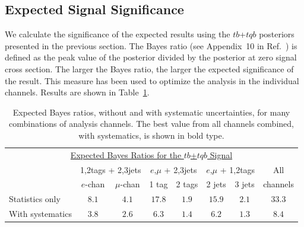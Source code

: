 \subsection{Expected Signal Significance}

We calculate the significance of the expected results using the
$tb$+$tqb$ posteriors presented in the previous section. The Bayes
ratio (see Appendix~10 in Ref.~\cite{general-note}) is defined as the
peak value of the posterior divided by the posterior at zero signal
cross section. The larger the Bayes ratio, the larger the expected
significance of the result. This measure has been used to optimize the
analysis in the individual channels.  Results are shown in
Table~\ref{bayes-ratio}.

\begin{table}[!h!tbp]
\begin{center}
\begin{minipage}{5in}
\begin{ruledtabular}
\begin{tabular}{l|cc|cc|cc|c}
  \multicolumn{8}{c}{\hspace{0.5in}\underline{Expected Bayes Ratios for the $tb$+$tqb$ Signal}}\vspace{0.1in}\\
& \multicolumn{2}{c|}{1,2tags + 2,3jets}& \multicolumn{2}{c|}{$e$,$\mu$ + 2,3jets}
& \multicolumn{2}{c|}{$e$,$\mu$ + 1,2tags}& All \\
                 &  $e$-chan & $\mu$-chan& 1 tag & 2 tags& 2 jets& 3 jets&channels\\
\hline
Statistics only  &  $8.1$  & $4.1$ & $17.8$ & $1.9$ & $15.9$ & $2.1$ & $33.3$     \\
With systematics &  $3.8$  & $2.6$ & $6.3$  & $1.4$ & $6.2$  & $1.3$ & $\mathbf{8.4}$     \\
\end{tabular}
\end{ruledtabular}
\vspace{-0.1in}
\caption[bayesratio]{Expected Bayes ratios, without and with
systematic uncertainties, for many combinations of analysis
channels. The best value from all channels combined, with
systematics, is shown in bold type.}
\label{bayes-ratio}
\end{minipage}
\end{center}
\end{table}


